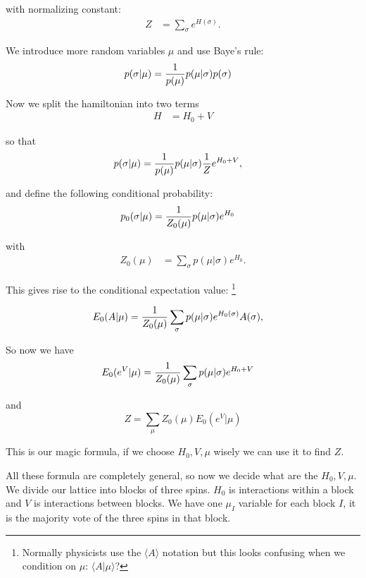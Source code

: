 \documentclass[11pt]{article}
\begin{document}
with normalizing constant:
\begin{align*}
Z &= \sum_{\sigma} e^{H(\sigma)}.
\end{align*}

We introduce more random variables $\mu$ and
use Baye's rule:
\begin{align*}
p(\sigma | \mu) &= {{1} \over {p(\mu)}}p(\mu | \sigma)p(\sigma)
\end{align*}

Now we split the hamiltonian into two terms
\begin{align*}
H &= H_{0}+V
\end{align*}

so that
\begin{align*}
p(\sigma | \mu) &= {{1} \over {p(\mu)}}p(\mu | \sigma){{1} \over {Z}}e^{H_{0}+V},
\end{align*}

and define the following conditional probability:
\begin{align*}
p_{0}(\sigma | \mu) &= {{1} \over {Z_{0}(\mu)}}p(\mu | \sigma)e^{H_{0}}
\end{align*}

with
\begin{align*}
Z_{0}(\mu) &= \sum_{\sigma} p(\mu | \sigma)e^{H_{0}}.
\end{align*}

This gives rise to the conditional expectation value:
\footnote{Normally physicists use the $\langle A\rangle$ notation
but this looks confusing when we condition on
$\mu$: $\langle A|\mu\rangle$?}

\begin{align*}
E_{0}(A | \mu) &= {{1} \over {Z_{0}(\mu)}}\sum_{\sigma} p(\mu | \sigma)e^{H_{0}(\sigma)}A(\sigma),
\end{align*}

So now we have
\begin{align*}
E_{0}(e^{V} | \mu) &= {{1} \over {Z_{0}(\mu)}}\sum_{\sigma} p(\mu | \sigma)e^{H_{0}+V}
\end{align*}

and
$$\boxed{Z = \sum_{\mu} Z_{0}(\mu)E_{0}(e^{V} | \mu)}$$

This is our magic formula, if we choose
$H_0, V, \mu$ wisely we can use it to find $Z$.

All these formula are completely general, so
now we decide what are the $H_0, V, \mu$.
We divide our lattice into blocks of three spins.
$H_0$ is interactions within a block and $V$ is
interactions between blocks.
We have one $\mu_I$ variable for each block $I$,
it is the majority vote of the three spins %
in that block.
\end{document}
